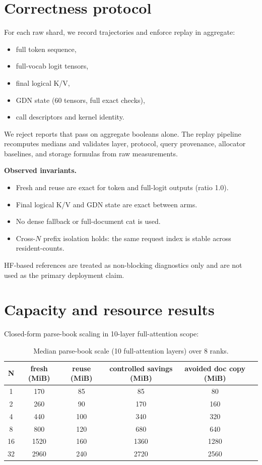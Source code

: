 \documentclass{article}
\begin{document}
\section{Correctness protocol}
For each raw shard, we record trajectories and enforce replay in aggregate:
\begin{itemize}
  \item full token sequence,
  \item full-vocab logit tensors,
  \item final logical K/V,
  \item GDN state (60 tensors, full exact checks),
  \item call descriptors and kernel identity.
\end{itemize}

We reject reports that pass on aggregate booleans alone. The replay pipeline recomputes medians and validates layer, protocol, query provenance, allocator baselines, and storage formulas from raw measurements.

\textbf{Observed invariants.}
\begin{itemize}
  \item Fresh and reuse are exact for token and full-logit outputs (ratio 1.0).
  \item Final logical K/V and GDN state are exact between arms.
  \item No dense fallback or full-document cat is used.
  \item Cross-$N$ prefix isolation holds: the same request index is stable across resident-counts.
\end{itemize}

HF-based references are treated as non-blocking diagnostics only and are not used as the primary deployment claim.

\section{Capacity and resource results}
Closed-form parse-book scaling in 10-layer full-attention scope:
\begin{table}[h]
\centering
\begin{tabular}{cccccc}
\toprule
N & fresh (MiB) & reuse (MiB) & controlled savings (MiB) & avoided doc copy (MiB)\\
\midrule
1 & 170 & 85 & 85 & 80\\
2 & 260 & 90 & 170 & 160\\
4 & 440 & 100 & 340 & 320\\
8 & 800 & 120 & 680 & 640\\
16 & 1520 & 160 & 1360 & 1280\\
32 & 2960 & 240 & 2720 & 2560\\
\bottomrule
\end{tabular}
\caption{Median parse-book scale (10 full-attention layers) over 8 ranks.}
\end{table}
\end{document}
